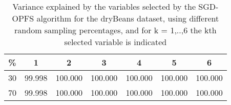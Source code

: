 \begin{table}
	\begin{center}
		\begin{tabular}{c c c c c c c}
			\% & 1 & 2 & 3 & 4 & 5 & 6 \\
			\hline
			30 & 99.998 & 100.000 & 100.000 & 100.000 & 100.000 & 100.000 \\
			70 & 99.998 & 100.000 & 100.000 & 100.000 & 100.000 & 100.000 \\
		\end{tabular}
	\end{center}
	\caption{Variance explained by the variables selected by the SGD-OPFS algorithm for the dryBeans dataset, using different random sampling percentages, and for k = 1,..,6 the kth selected variable is indicated}
\end{table}